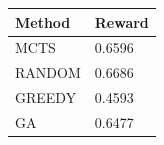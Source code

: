 \begin{tabular}{ll}
\hline
Method & Reward \\
\hline
  MCTS & 0.6596 \\
  RANDOM & 0.6686 \\
  GREEDY & 0.4593 \\
  GA & 0.6477 \\
\hline
\end{tabular}
